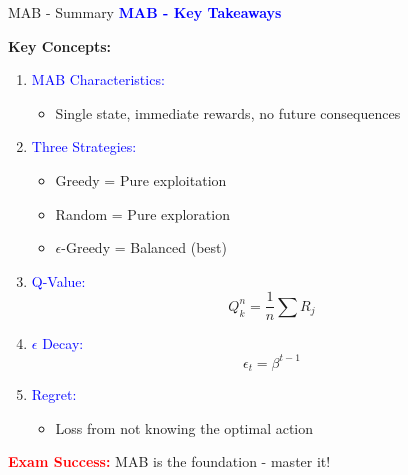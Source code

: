 \documentclass[8pt]{beamer}
\begin{document}
	\begin{frame}{MAB - Summary}
		\fontsize{6.5}{7.5}\selectfont
		\textcolor{blue}{\textbf{MAB - Key Takeaways}}
		
		\textbf{Key Concepts:}
		\begin{enumerate}
			\item \textcolor{blue}{MAB Characteristics:}
			\begin{itemize}
				\item Single state, immediate rewards, no future consequences
			\end{itemize}
			
			\item \textcolor{blue}{Three Strategies:}
			\begin{itemize}
				\item Greedy = Pure exploitation
				\item Random = Pure exploration
				\item $\epsilon$-Greedy = Balanced (best)
			\end{itemize}
			
			\item \textcolor{blue}{Q-Value:}
			\[
			Q_k^n = \frac{1}{n}\sum R_j
			\]
			
			\item \textcolor{blue}{$\epsilon$ Decay:}
			\[
			\epsilon_t = \beta^{t-1}
			\]
			
			\item \textcolor{blue}{Regret:}
			\begin{itemize}
				\item Loss from not knowing the optimal action
			\end{itemize}
		\end{enumerate}
		
		\textcolor{red}{\textbf{Exam Success:}} MAB is the foundation - master it!
	\end{frame}
	
	
\end{document}
